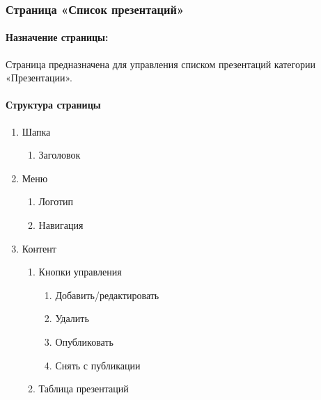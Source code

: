 \subsubsection{Страница «Список презентаций»}
\paragraph{Назначение страницы:} Страница предназначена для управления списком презентаций категории «Презентации».

\paragraph{Структура страницы}
\begin{enumerate}
	\item Шапка
	\begin{enumerate}
		\item Заголовок
	\end{enumerate}

	\item Меню
	\begin{enumerate}
		\item Логотип
		\item Навигация
	\end{enumerate}

	\item Контент
	\begin{enumerate}
		\item Кнопки управления
		\begin{enumerate}
			\item Добавить/редактировать
			\item Удалить
			\item Опубликовать
			\item Снять с публикации
		\end{enumerate}
		\item Таблица презентаций
	\end{enumerate}
\end{enumerate}

